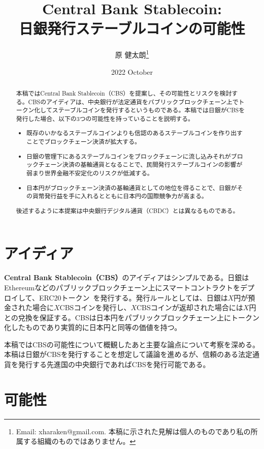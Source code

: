 \documentclass[dvipdfmx,a4paper]{jsarticle}
\title{\textbf{Central Bank Stablecoin:\\日銀発行ステーブルコインの可能性}}
\author{原 健太朗\footnote{Email: xharaken@gmail.com. 本稿に示された見解は個人のものであり私の所属する組織のものではありません。}}
\date{2022 October}
\begin{document}
\maketitle

\begin{abstract}

本稿ではCentral Bank Stablecoin（CBS）を提案し、その可能性とリスクを検討する。CBSのアイディアは、中央銀行が法定通貨をパブリックブロックチェーン上でトークン化してステーブルコインを発行するというものである。本稿では日銀がCBSを発行した場合、以下の3つの可能性を持っていることを説明する。

\begin{itemize}
\item 既存のいかなるステーブルコインよりも信認のあるステーブルコインを作り出すことでブロックチェーン決済が拡大する。
\item 日銀の管理下にあるステーブルコインをブロックチェーンに流し込みそれがブロックチェーン決済の基軸通貨となることで、民間発行ステーブルコインの影響が弱まり世界金融不安定化のリスクが低減する。
\item 日本円がブロックチェーン決済の基軸通貨としての地位を得ることで、日銀がその貨幣発行益を手に入れるとともに日本円の国際競争力が高まる。
\end{itemize}

後述するように本提案は中央銀行デジタル通貨（CBDC）とは異なるものである。

\end{abstract}

\section{アイディア}

\textbf{Central Bank Stablecoin（CBS）}のアイディアはシンプルである。日銀はEthereumなどのパブリックブロックチェーン上にスマートコントラクトをデプロイして、ERC20トークン~\cite{erc20token}を発行する。発行ルールとしては、日銀は$X$円が預金された場合に$X$CBSコインを発行し、$X$CBSコインが返却された場合には$X$円との兌換を保証する。CBSは日本円をパブリックブロックチェーン上にトークン化したものであり実質的に日本円と同等の価値を持つ。

本稿ではCBSの可能性について概観したあと主要な論点について考察を深める。本稿は日銀がCBSを発行することを想定して議論を進めるが、信頼のある法定通貨を発行する先進国の中央銀行であればCBSを発行可能である。

\section{可能性}
\end{document}
